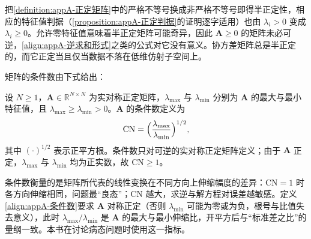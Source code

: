 \documentclass[../main.tex]{subfiles}
\begin{document}
\begin{remark}
把\cref{definition:appA-正定矩阵}中的严格不等号换成非严格不等号即得半正定性，相应的特征值判据（\cref{proposition:appA-正定判据}的证明逐字适用）也由 $\lambda_i>0$ 变成 $\lambda_i\geqslant0$。允许零特征值意味着半正定矩阵可能奇异，因此 $\bm{A}\geqslant0$ 的矩阵未必可逆，\eqref{align:appA-逆求和形式}之类的公式对它没有意义。协方差矩阵总是半正定的，而它正定当且仅当数据不落在低维仿射子空间上。
\end{remark}

矩阵的条件数由下式给出：
\begin{definition}[条件数]\label{definition:appA-条件数}
设 $N\geqslant1$，$\bm{A}\in\mathbb{R}^{N\times N}$ 为实对称正定矩阵，$\lambda_{\max}$ 与 $\lambda_{\min}$ 分别为 $\bm{A}$ 的最大与最小特征值，且 $\lambda_{\max}\geqslant\lambda_{\min}>0$。$\bm{A}$ 的条件数定义为
\begin{align}
  \mathrm{CN}=\Bigl(\frac{\lambda_{\max}}{\lambda_{\min}}\Bigr)^{1/2},
  \label{align:appA-条件数}
\end{align}
其中 $(\cdot)^{1/2}$ 表示正平方根。条件数只对可逆的实对称正定矩阵定义；由于 $\bm{A}$ 正定，$\lambda_{\max}$ 与 $\lambda_{\min}$ 均为正实数，故 $\mathrm{CN}\geqslant1$。
\end{definition}

\begin{remark}
条件数衡量的是矩阵所代表的线性变换在不同方向上伸缩幅度的差异：$\mathrm{CN}=1$ 时各方向伸缩相同，问题最“良态”；$\mathrm{CN}$ 越大，求逆与解方程对误差越敏感。定义\eqref{align:appA-条件数}要求 $\bm{A}$ 对称正定（否则 $\lambda_{\min}$ 可能为零或为负，根号与比值失去意义），此时 $\lambda_{\max}/\lambda_{\min}$ 是 $\bm{A}$ 的最大与最小伸缩比，开平方后与“标准差之比”的量纲一致。本书在讨论病态问题时使用这一指标。
\end{remark}
\end{document}
